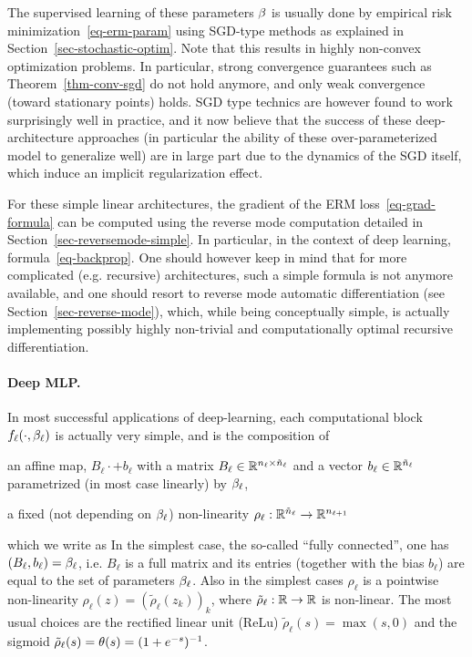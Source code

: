 The supervised learning of these parameters $\beta$ is usually done by empirical risk minimization~\eqref{eq-erm-param} using SGD-type methods as explained in Section~\ref{sec-stochastic-optim}. Note that this results in highly non-convex optimization problems. In particular, strong convergence guarantees such as Theorem~\ref{thm-conv-sgd} do not hold anymore, and only weak convergence (toward stationary points) holds. SGD type technics are however found to work surprisingly well in practice, and it now believe that the success of these deep-architecture approaches (in particular the ability of these over-parameterized model to generalize well) are in large part due to the dynamics of the SGD itself, which induce an implicit regularization effect. 

For these simple linear architectures, the gradient of the ERM loss~\eqref{eq-grad-formula} can be computed using the reverse mode computation detailed in Section~\ref{sec-reversemode-simple}. In particular, in the context of deep learning, formula~\eqref{eq-backprop}. One should however keep in mind that for more complicated (e.g. recursive) architectures, such a simple formula is not anymore available, and one should resort to reverse mode automatic differentiation (see Section~\ref{sec-reverse-mode}), which, while being conceptually simple, is actually implementing possibly highly non-trivial and computationally optimal recursive differentiation. 

\paragraph{Deep MLP.}

In most successful applications of deep-learning, each computational block $f_{\ell}(\cdot,\beta_\ell)$ is actually very simple, and is the composition of 
\begin{rs}
	\item an affine map, $B_\ell \cdot + b_\ell$ with a matrix $B_\ell \in \mathbb{R}^{n_\ell \times \tilde n_{\ell}}$ and a vector $b_\ell \in \mathbb{R}^{\tilde n_\ell}$ parametrized (in most case linearly) by $\beta_\ell$, 
	\item a fixed (not depending on $\beta_\ell$) non-linearity $\rho_\ell : \mathbb{R}^{\tilde n_{\ell}} \rightarrow \mathbb{R}^{n_{\ell+1}}$
\end{rs}
which we write as
In the simplest case, the so-called ``fully connected'', one has $(B_\ell,b_\ell)=\beta_\ell$, i.e. $B_\ell$ is a full matrix and its entries (together with the bias $b_\ell$) are equal to the set of parameters $\beta_\ell$. 
%
Also in the simplest cases $\rho_\ell$ is a pointwise non-linearity $\rho_\ell(z)=(\tilde\rho_\ell(z_k))_k$, where $\tilde\rho_\ell : \mathbb{R} \rightarrow \mathbb{R}$ is non-linear. The most usual choices are the rectified linear unit (ReLu) $\tilde\rho_\ell(s)=\max(s,0)$ and the sigmoid $\tilde\rho_\ell(s)=\theta(s) = (1+e^{-s})^{-1}$.

